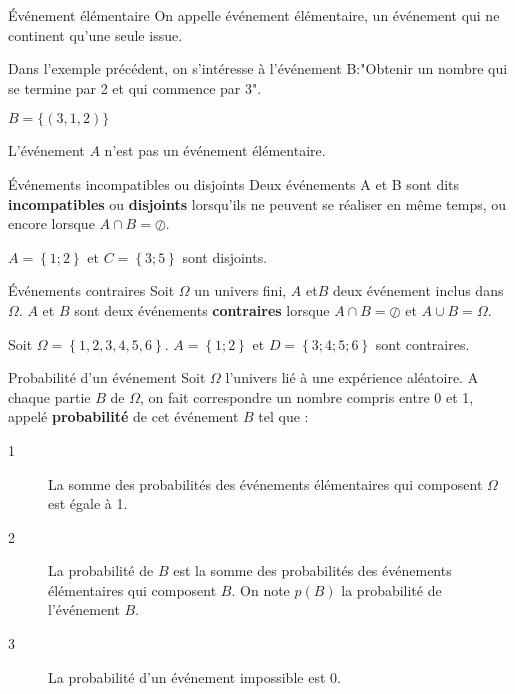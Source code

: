 \begin{DefT}{Événement élémentaire}
On appelle événement élémentaire, un événement qui ne continent qu'une seule issue.

\end{DefT}


\begin{Ex}

Dans l'exemple précédent, on s'intéresse à l'événement B:"Obtenir un nombre qui se termine par 2 et qui commence par 3".

$B = \lbrace(3,1,2)\rbrace$
\end{Ex}


\begin{Att}

L'événement $A$ n'est pas un événement élémentaire.
\end{Att}



\begin{DefT}{Événements incompatibles ou disjoints} 
Deux événements A et B sont dits \textbf{incompatibles} ou \textbf{disjoints} lorsqu'ils ne peuvent se réaliser en même temps,
ou encore lorsque $A \cap B = \oslash$.
\end{DefT}

\begin{Ex}
$A = \left\lbrace 1 ; 2 \right\rbrace $ et $C = \left\lbrace  3 ; 5 \right\rbrace$ sont disjoints.
\end{Ex}


\begin{DefT}{Événements contraires} 
Soit $\Omega$ un univers fini, $A$ et$ B$ deux événement inclus dans $\Omega$.
$A$ et $B$ sont deux événements \textbf{contraires} lorsque $A \cap B = \oslash$ et $A \cup B = \Omega$.
\end{DefT}

\begin{Ex}
Soit $\Omega =  \left\lbrace 1, 2, 3, 4, 5, 6 \right\rbrace $. $A = \left\lbrace1 ; 2\right\rbrace $ et $D = \left\lbrace 3 ; 4 ; 5 ; 6 \right\rbrace $ sont contraires.
\end{Ex}



\begin{DefT}{Probabilité d'un événement} 
Soit $\Omega$ l'univers lié à une expérience aléatoire.
A chaque partie $B$ de $\Omega$, on fait correspondre un nombre compris entre 0 et 1, appelé \textbf{probabilité} de cet
événement $B$ tel que :
\begin{description}
\item[1] La somme des probabilités des événements élémentaires qui composent $\Omega$ est égale à 1.
\item[2] La probabilité de $B$ est la somme des probabilités des événements élémentaires qui composent $B$. On note $p(B)$ la probabilité de l'événement $B$.
\item[3] La probabilité d'un événement impossible est 0. 
\end{description}
\end{DefT}

